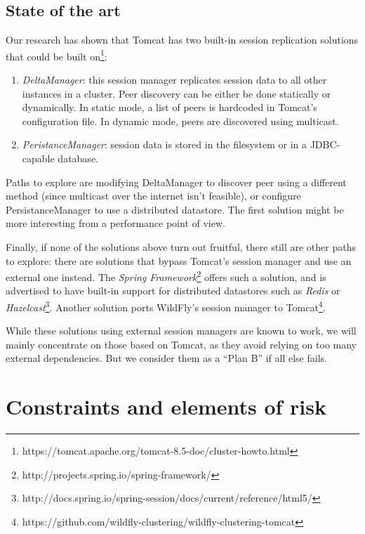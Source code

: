 \documentclass[11pt,a4paper]{article}
\begin{document}
\subsection{State of the art}

Our research has shown that Tomcat has two built-in session replication
solutions that could be built
on\footnote{https://tomcat.apache.org/tomcat-8.5-doc/cluster-howto.html}:

\begin{enumerate}
    \item \emph{DeltaManager}: this session manager replicates session data to
        all other instances in a cluster. Peer discovery can be either be done
        statically or dynamically. In static mode, a list of peers is hardcoded
        in Tomcat's configuration file. In dynamic mode, peers are discovered
        using multicast.

    \item \emph{PeristanceManager}: session data is stored in the filesystem or
        in a JDBC-capable database.
\end{enumerate}

Paths to explore are modifying DeltaManager to discover peer using a different
method (since multicast over the internet isn't feasible), or configure
PersistanceManager to use a distributed datastore. The first solution might be
more interesting from a performance point of view.

Finally, if none of the solutions above turn out fruitful, there still are
other paths to explore: there are solutions that bypass Tomcat's session
manager and use an external one instead. The \emph{Spring
    Framework}\footnote{http://projects.spring.io/spring-framework/} offers
such a solution, and is advertised to have built-in support for distributed
datastores such as \emph{Redis} or
\emph{Hazelcast}\footnote{http://docs.spring.io/spring-session/docs/current/reference/html5/}.
Another solution ports WildFly's session manager to
Tomcat\footnote{https://github.com/wildfly-clustering/wildfly-clustering-tomcat}.

While these solutions using external session managers are known to work, we
will mainly concentrate on those based on Tomcat, as they avoid relying on too
many external dependencies. But we consider them as a ``Plan B'' if all else
fails.

\section{Constraints and elements of risk}
\end{document}
